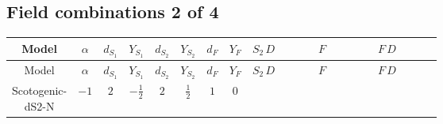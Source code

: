 \documentclass[8pt]{article}
\begin{document}
\begin{landscape}
\subsection*{Field combinations 2 of 4}
\begin{longtable}{@{}cccccccc >{\raggedright\arraybackslash}p{0.21\linewidth} >{\raggedright\arraybackslash}p{0.21\linewidth} >{\raggedright\arraybackslash}p{0.21\linewidth}@{}}
\toprule
Model & $\alpha$ & $d_{S_1}$ & $Y_{S_1}$ & $d_{S_2}$ & $Y_{S_2}$ & $d_F$ & $Y_F$ & $S_2\,D$ & $F$ & $F\,D$ \\
\midrule
\endfirsthead
\toprule
Model & $\alpha$ & $d_{S_1}$ & $Y_{S_1}$ & $d_{S_2}$ & $Y_{S_2}$ & $d_F$ & $Y_F$ & $S_2\,D$ & $F$ & $F\,D$ \\
\midrule
\endhead
Scotogenic-dS2-N & $-1$ & $2$ & $-\frac{1}{2}$ & $2$ & $\frac{1}{2}$ & $1$ & $0$ & \scriptsize\adjustbox{max width=\linewidth}{$\begin{gathered} +D_{\mu _1}\left(S_{2,j_1}\right){}^{\dagger } D_{\mu _1}\left(S_{2,j_1}\right)\end{gathered}$} & \scriptsize\adjustbox{max width=\linewidth}{$\begin{gathered} -\frac{1}{2} F_{r_1}{}^T\, C\, F_{r_1} M_F\end{gathered}$} & \scriptsize\adjustbox{max width=\linewidth}{$\begin{gathered} +\frac{1}{2} i F_{r_1}{}^T\, C\, \gamma ^{\mu _1}\, D_{\mu _1}\left(F_{r_1}\right)\end{gathered}$} \\
\midrule
\bottomrule
\end{longtable}
\clearpage

\end{landscape}
\end{document}
